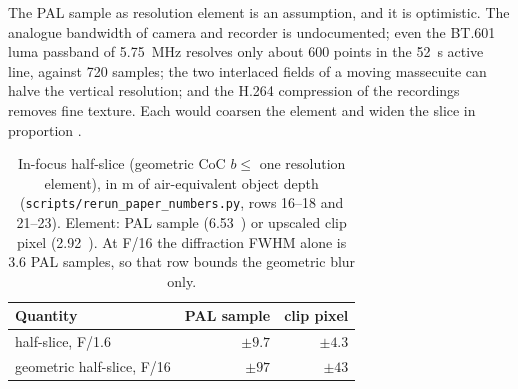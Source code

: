 The PAL sample as resolution element is an assumption, and it is optimistic. The analogue bandwidth of camera and
recorder is undocumented; even the BT.601 luma passband of 5.75~MHz \citep{ITUBT601} resolves only about 600 points in
the 52~\textmu s active line, against 720 samples; the two interlaced fields of a moving massecuite can halve the
vertical resolution; and the H.264 compression of the recordings removes fine texture. Each would coarsen the element
and widen the slice in proportion .

\begin{table}
\centering\tabfont
\caption{In-focus half-slice (geometric CoC $b \le$ one resolution element), in \textmu m of
air-equivalent object depth (\texttt{scripts/rerun\_paper\_numbers.py}, rows 16--18 and 21--23). Element: PAL sample
(6.53~\um) or upscaled clip pixel (2.92~\um). At F/16 the diffraction FWHM alone is 3.6 PAL samples, so that row
bounds the geometric blur only.}\label{tab:dof}
\begin{tabular}{@{}lrr@{}}
\toprule
Quantity & PAL sample & clip pixel \\
\midrule
half-slice, F/1.6 & $\pm 9.7$ & $\pm 4.3$ \\
geometric half-slice, F/16 & $\pm 97$ & $\pm 43$ \\
\bottomrule
\end{tabular}
\end{table}
